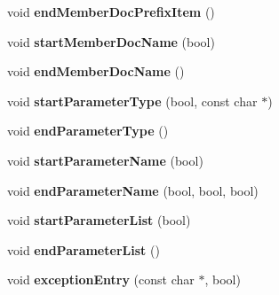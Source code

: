 \begin{DoxyCompactItemize}
\item 
\hypertarget{class_latex_generator_a797315065ef118ee81fc1828eb5f7e5d}{void {\bfseries end\-Member\-Doc\-Prefix\-Item} ()}\label{class_latex_generator_a797315065ef118ee81fc1828eb5f7e5d}

\item 
\hypertarget{class_latex_generator_a75e84ed33d454731b67946c1eec42c8e}{void {\bfseries start\-Member\-Doc\-Name} (bool)}\label{class_latex_generator_a75e84ed33d454731b67946c1eec42c8e}

\item 
\hypertarget{class_latex_generator_ab8f5f35025a2dfa4026e02e5e586b27e}{void {\bfseries end\-Member\-Doc\-Name} ()}\label{class_latex_generator_ab8f5f35025a2dfa4026e02e5e586b27e}

\item 
\hypertarget{class_latex_generator_a16e366b8ae01f3d7dea6bef22426a623}{void {\bfseries start\-Parameter\-Type} (bool, const char $\ast$)}\label{class_latex_generator_a16e366b8ae01f3d7dea6bef22426a623}

\item 
\hypertarget{class_latex_generator_a1e61ed71851d9423940748df3342715b}{void {\bfseries end\-Parameter\-Type} ()}\label{class_latex_generator_a1e61ed71851d9423940748df3342715b}

\item 
\hypertarget{class_latex_generator_aaa80b6d46b0b3f69f5604a6394aad2de}{void {\bfseries start\-Parameter\-Name} (bool)}\label{class_latex_generator_aaa80b6d46b0b3f69f5604a6394aad2de}

\item 
\hypertarget{class_latex_generator_a2eb32de99cf4ffa66d38b4d1dc304ad4}{void {\bfseries end\-Parameter\-Name} (bool, bool, bool)}\label{class_latex_generator_a2eb32de99cf4ffa66d38b4d1dc304ad4}

\item 
\hypertarget{class_latex_generator_a61b1ab9b798f5af0ec297a1b70b943eb}{void {\bfseries start\-Parameter\-List} (bool)}\label{class_latex_generator_a61b1ab9b798f5af0ec297a1b70b943eb}

\item 
\hypertarget{class_latex_generator_a18eb29acbeb3f72b0d8f4ea23b21f054}{void {\bfseries end\-Parameter\-List} ()}\label{class_latex_generator_a18eb29acbeb3f72b0d8f4ea23b21f054}

\item 
\hypertarget{class_latex_generator_afe0983cd10a7702e0bf3c3596b9f7b87}{void {\bfseries exception\-Entry} (const char $\ast$, bool)}\label{class_latex_generator_afe0983cd10a7702e0bf3c3596b9f7b87}


\end{DoxyCompactItemize}
